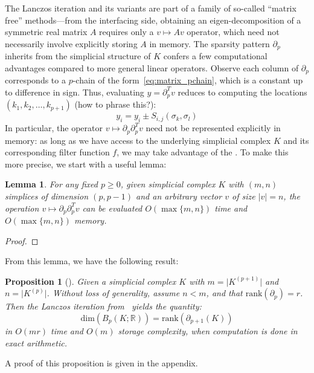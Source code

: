 \documentclass[10pt]{article}
\newcommand{\+}{%
	\raisebox{0.18ex}{\scaleobj{0.55}{+}}
}
\newtheorem{proposition}{Proposition}
\newtheorem{lemma}{Lemma}
\theoremstyle{definition}
\begin{document}
The Lanczos iteration and its variants are part of a family of so-called ``matrix free'' methods---from the interfacing side, obtaining an eigen-decomposition of a symmetric real matrix $A$ requires only a $v \mapsto Av$ operator, which need not necessarily involve explicitly storing $A$ in memory. 
The sparsity pattern $\partial_p$ inherits from the simplicial structure of $K$ confers a few computational advantages compared to more general linear operators. Observe each column of $\partial_p$ corresponds to a $p$-chain of the form~\eqref{eq:matrix_pchain}, which is a constant up to difference in sign. Thus, evaluating $y = \partial_p^T v$ reduces to computing the locations $(k_1, k_2, \dots, k_{p+1})$ (how to phrase this?):
\begin{equation}
	y_{i} = y_i \pm S_{i,j}(\sigma_k, \sigma_l)
\end{equation}
In particular, the operator $v \mapsto \partial_p \partial_p^T v$ need not be represented explicitly in memory: as long as we have access to the underlying simplicial complex $K$ and its corresponding filter function $f$, we may take advantage of the .
To make this more precise, we start with a useful lemma:
\begin{lemma}
For any fixed $p \geq 0$, given simplicial complex $K$ with $(m, n)$ simplices of dimension $(p, p - 1)$ and an arbitrary vector $v$ of size $\lvert v \rvert = n$, the operation $v \mapsto \partial_p \partial_p^T v$ can be evaluated $O(\max \{m,n\})$ time and $O(\max \{m,n\})$ memory. 
\end{lemma}
\begin{proof}
	
\end{proof}
From this lemma, we have the following result: 
\begin{proposition}[\cite{parlett1994we, simon1984analysis}]\label{prop:exact_arith_matvec}
	Given a simplicial complex $K$ with $m = \lvert K^{(p+1)} \rvert$ and $n = \lvert K^{(p)} \rvert$. Without loss of generality, assume $n < m$, and that $\mathrm{rank}(\partial_p) = r$. 
	Then the Lanczos iteration from~\cite{} yields the quantity:
	\begin{equation}
		\mathrm{dim}(B_{p}(K; \mathbb{R})) = \mathrm{rank}(\partial_{p+1}(K))
	\end{equation}
	in $O(mr)$ time and $O(m)$ storage complexity, when computation is done in exact arithmetic. 
\end{proposition}
\noindent A proof of this proposition is given in the appendix. 
\end{document}
